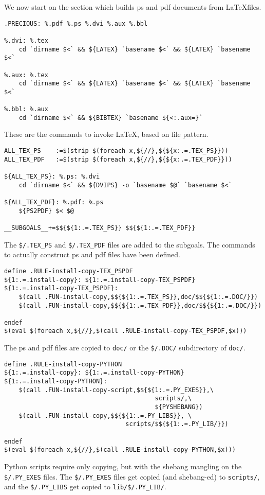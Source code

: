 \documentclass{article}
\begin{document}
We now start on the section which builds ps and pdf documents from
\LaTeX files.
\begin{verbatim}
.PRECIOUS: %.pdf %.ps %.dvi %.aux %.bbl

%.dvi: %.tex
	cd `dirname $<` && ${LATEX} `basename $<` && ${LATEX} `basename $<`

%.aux: %.tex
	cd `dirname $<` && ${LATEX} `basename $<` && ${LATEX} `basename $<`

%.bbl: %.aux
	cd `dirname $<` && ${BIBTEX} `basename ${<:.aux=}`
\end{verbatim}
These are the commands to invoke \LaTeX, based on file pattern.

\begin{verbatim}
ALL_TEX_PS    :=$(strip $(foreach x,${//},${${x:.=.TEX_PS}}))
ALL_TEX_PDF   :=$(strip $(foreach x,${//},${${x:.=.TEX_PDF}}))

${ALL_TEX_PS}: %.ps: %.dvi
	cd `dirname $<` && ${DVIPS} -o `basename $@` `basename $<`

${ALL_TEX_PDF}: %.pdf: %.ps
	${PS2PDF} $< $@

__SUBGOALS__+=$${${1:.=.TEX_PS}} $${${1:.=.TEX_PDF}}
\end{verbatim}
The \verb+$/.TEX_PS+ and \verb+$/.TEX_PDF+ files are added to the
subgoals.  The commands to actually construct ps and pdf files 
have been defined.

\begin{verbatim}
define .RULE-install-copy-TEX_PSPDF
${1:.=.install-copy}: ${1:.=.install-copy-TEX_PSPDF}
${1:.=.install-copy-TEX_PSPDF}:
	$(call .FUN-install-copy,$${${1:.=.TEX_PS}},doc/$${${1:.=.DOC/}})
	$(call .FUN-install-copy,$${${1:.=.TEX_PDF}},doc/$${${1:.=.DOC/}})

endef
$(eval $(foreach x,${//},$(call .RULE-install-copy-TEX_PSPDF,$x)))
\end{verbatim}
The ps and pdf files are copied to \verb+doc/+ or the
\verb+$/.DOC/+ subdirectory of \verb+doc/+.

\begin{verbatim}
define .RULE-install-copy-PYTHON
${1:.=.install-copy}: ${1:.=.install-copy-PYTHON}
${1:.=.install-copy-PYTHON}:
	$(call .FUN-install-copy-script,$${${1:.=.PY_EXES}},\
                                         scripts/,\
                                         ${PYSHEBANG})
	$(call .FUN-install-copy,$${${1:.=.PY_LIBS}}, \
                                 scripts/$${${1:.=.PY_LIB/}})

endef
$(eval $(foreach x,${//},$(call .RULE-install-copy-PYTHON,$x)))
\end{verbatim}
Python scripts require only copying, but with the shebang mangling
on the \verb+$/.PY_EXES+ files.  The \verb+$/.PY_EXES+ files get
copied (and shebang-ed) to \verb+scripts/+, and the
\verb+$/.PY_LIBS+ get copied to \verb+lib/$/.PY_LIB/+.
\end{document}
